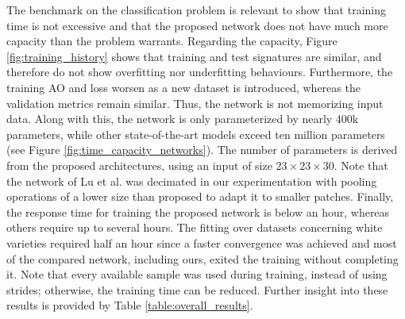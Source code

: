 The benchmark on the classification problem is relevant to show that training time is not excessive and that the proposed network does not have much more capacity than the problem warrants. Regarding the capacity, Figure \ref{fig:training_history} shows that training and test signatures are similar, and therefore do not show overfitting nor underfitting behaviours. Furthermore, the training AO and loss worsen as a new dataset is introduced, whereas the validation metrics remain similar. Thus, the network is not memorizing input data. Along with this, the network is only parameterized by nearly 400k parameters, while other state-of-the-art models exceed ten million parameters (see Figure \ref{fig:time_capacity_networks}). The number of parameters is derived from the proposed architectures, using an input of size $23 \times 23 \times 30$. Note that the network of Lu et al. \cite{lu_hyperspectral_2022} was decimated in our experimentation with pooling operations of a lower size than proposed to adapt it to smaller patches. Finally, the response time for training the proposed network is below an hour, whereas others require up to several hours. The fitting over datasets concerning white varieties required half an hour since a faster convergence was achieved and most of the compared network, including ours, exited the training without completing it. Note that every available sample was used during training, instead of using strides; otherwise, the training time can be reduced. Further insight into these results is provided by Table \ref{table:overall_results}.

